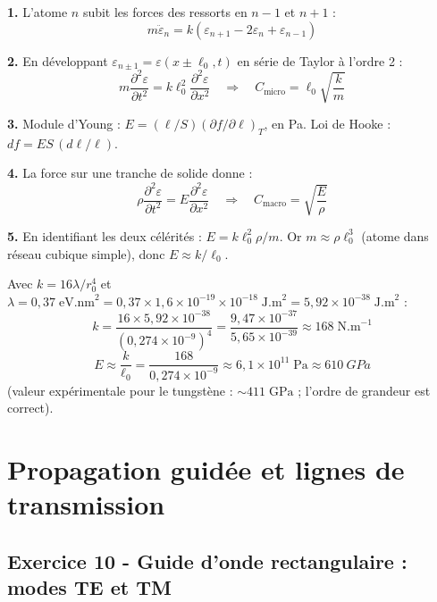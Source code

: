 \documentclass[12pt,a4paper]{article}
\begin{document}
\begin{boitecorrige}
\textbf{1.} L'atome $n$ subit les forces des ressorts en $n-1$ et $n+1$ :
\[
m\ddot{\varepsilon}_n = k(\varepsilon_{n+1} - 2\varepsilon_n + \varepsilon_{n-1})
\]

\textbf{2.} En développant $\varepsilon_{n\pm1} = \varepsilon(x\pm\ell_0,t)$ en série de Taylor à l'ordre 2 :
\[
m\frac{\partial^2\varepsilon}{\partial t^2} = k\ell_0^2\frac{\partial^2\varepsilon}{\partial x^2}
\quad\Longrightarrow\quad C_\text{micro} = \ell_0\sqrt{\frac{k}{m}}
\]

\textbf{3.} Module d'Young : $E = (\ell/S)(\partial f/\partial\ell)_T$, en Pa. Loi de Hooke : $df = ES\,(d\ell/\ell)$.

\textbf{4.} La force sur une tranche de solide donne :
\[
\rho\frac{\partial^2\varepsilon}{\partial t^2} = E\frac{\partial^2\varepsilon}{\partial x^2}
\quad\Longrightarrow\quad C_\text{macro} = \sqrt{\frac{E}{\rho}}
\]

\textbf{5.} En identifiant les deux célérités : $E = k\ell_0^2\rho/m$. Or $m \approx \rho\ell_0^3$ (atome dans réseau cubique simple), donc $E \approx k/\ell_0$.

Avec $k = 16\lambda/r_0^4$ et $\lambda = 0{,}37\;\text{eV.nm}^2 = 0{,}37\times1{,}6\times10^{-19}\times10^{-18}\;\text{J.m}^2 = 5{,}92\times10^{-38}\;\text{J.m}^2$ :
\[
k = \frac{16\times5{,}92\times10^{-38}}{(0{,}274\times10^{-9})^4} = \frac{9{,}47\times10^{-37}}{5{,}65\times10^{-39}} \approx 168\;\text{N.m}^{-1}
\]
\[
E \approx \frac{k}{\ell_0} = \frac{168}{0{,}274\times10^{-9}} \approx 6{,}1\times10^{11}\;\text{Pa} \approx \qty{610}{GPa}
\]
(valeur expérimentale pour le tungstène : $\sim 411\;\text{GPa}$ ; l'ordre de grandeur est correct).
\end{boitecorrige}


\newpage
\section{Propagation guidée et lignes de transmission}

\subsection*{Exercice 10 - Guide d'onde rectangulaire : modes TE et TM \niveau{\difficile}}
\end{document}

